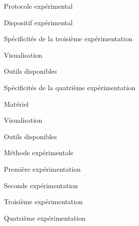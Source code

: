 \documentclass[myfrancais]{mythesis}
\begin{document}
\begin{mychapter}{Protocole expérimental}
\begin{mysection}{Dispositif expérimental}
\begin{mysubsection}{Spécificités de la troisième expérimentation}
				\begin{mysubsubsection}{Visualisation}
				\end{mysubsubsection}
				\begin{mysubsubsection}{Outils disponibles}
				\end{mysubsubsection}
			\end{mysubsection}
			\begin{mysubsection}{Spécificités de la quatrième expérimentation}
				\begin{mysubsubsection}{Matériel}
				\end{mysubsubsection}
				\begin{mysubsubsection}{Visualisation}
				\end{mysubsubsection}
				\begin{mysubsubsection}{Outils disponibles}
				\end{mysubsubsection}
			\end{mysubsection}
		\end{mysection}
		\begin{mysection}{Méthode expérimentale}
			\begin{mysubsection}{Première expérimentation}
			\end{mysubsection}
			\begin{mysubsection}{Seconde expérimentation}
			\end{mysubsection}
			\begin{mysubsection}{Troisième expérimentation}
			\end{mysubsection}
			\begin{mysubsection}{Quatrième expérimentation}
			\end{mysubsection}
		\end{mysection}
	\end{mychapter}
\end{document}
